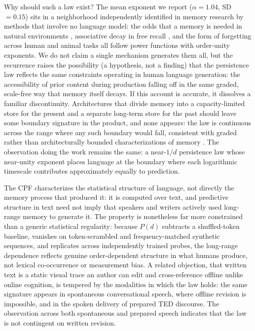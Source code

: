 \documentclass[11pt]{article}
\begin{document}
Why should such a law exist? The mean exponent we report ($\alpha=1.04$, SD $=0.15$) sits in a
neighborhood independently identified in memory research by methods that involve no language
model: the odds that a memory is needed in natural environments \citep{anderson1991reflections},
associative decay in free recall \citep{kahana2002age}, and the form of forgetting across human
and animal tasks \citep{wixted1991form} all follow power functions with order-unity exponents. We
do not claim a single mechanism generates them all, but the recurrence raises the possibility (a
hypothesis, not a finding) that the persistence law reflects the same constraints operating in
human language generation: the accessibility of prior content during production falling off in
the same graded, scale-free way that memory itself decays. If this account is accurate, it
dissolves a familiar discontinuity. Architectures that divide memory into a capacity-limited
store for the present and a separate long-term store for the past should leave some boundary
signature in the product, and none appears: the law is continuous across the range where any such
boundary would fall, consistent with graded rather than architecturally bounded characterizations
of memory \citep{cowan2001magical, ericsson1995longterm, ma2014changing}. The observation doing the work
remains the same: a near-$1/d$ persistence law whose near-unity exponent places language at the
boundary where each logarithmic timescale contributes approximately equally to prediction.

The CPF characterizes the statistical structure of language, not directly the memory process
that produced it: it is computed over text, and predictive structure in text need not imply that
speakers and writers actively used long-range memory to generate it. The property is nonetheless
far more constrained than a generic statistical regularity: because $P(d)$ subtracts a
shuffled-token baseline, vanishes on token-scrambled and frequency-matched synthetic sequences,
and replicates across independently trained probes, the long-range dependence reflects genuine
order-dependent structure in what humans produce, not lexical co-occurrence or measurement bias. A related objection, that written text is a static
visual trace an author can edit and cross-reference offline unlike online cognition, is
tempered by the modalities in which the law holds: the same signature appears in spontaneous
conversational speech, where offline revision is impossible, and in the spoken delivery of
prepared TED discourse. The observation across both spontaneous and prepared speech indicates
that the law is not contingent on written revision.
\end{document}
